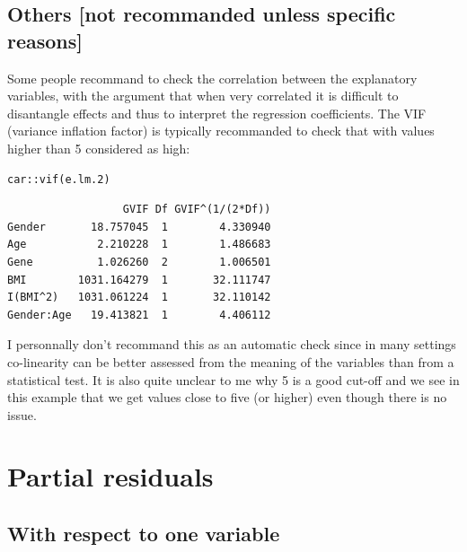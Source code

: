 \documentclass[12pt]{article}
\begin{document}
\subsection{Others [not recommanded unless specific reasons]}
\label{sec:orga8faec6}
Some people recommand to check the correlation between the explanatory
variables, with the argument that when very correlated it is difficult
to disantangle effects and thus to interpret the regression
coefficients. The VIF (variance inflation factor) is typically
recommanded to check that with values higher than 5 considered as
high:

\lstset{language=r,label= ,caption= ,captionpos=b,numbers=none}
\begin{lstlisting}
car::vif(e.lm.2)
\end{lstlisting}

\begin{verbatim}
                  GVIF Df GVIF^(1/(2*Df))
Gender       18.757045  1        4.330940
Age           2.210228  1        1.486683
Gene          1.026260  2        1.006501
BMI        1031.164279  1       32.111747
I(BMI^2)   1031.061224  1       32.110142
Gender:Age   19.413821  1        4.406112
\end{verbatim}

I personnally don't recommand this as an automatic check since in many
  settings co-linearity can be better assessed from the meaning of the
  variables than from a statistical test. It is also quite unclear to
  me why 5 is a good cut-off and we see in this example that we get
  values close to five (or higher) even though there is no issue.

\clearpage

\section{Partial residuals}
\label{sec:orgb8cb20b}
\subsection{With respect to one variable}
\label{sec:org89193dc}
\end{document}
